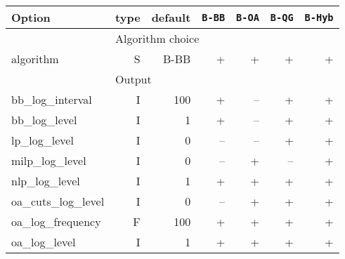\begin{center}
\begin{tabular}{|l|r|r|r|r|r|r|}\hline
Option & type &  default & {\tt B-BB} & {\tt B-OA} & {\tt B-QG} & {\tt B-Hyb} \\
\hline
\hline
\multicolumn{1}{|c}{} & \multicolumn{6}{l|}{Algorithm choice}\\
\hline
algorithm& S& B-BB& +& +& +& +\\
\hline
\multicolumn{1}{|c}{} & \multicolumn{6}{l|}{Output}\\
\hline
bb\_log\_interval& I& 100& +&--& +& +\\
bb\_log\_level& I& 1& +&--& +& +\\
lp\_log\_level& I& 0&--&--& +& +\\
milp\_log\_level& I& 0&--& +&--& +\\
nlp\_log\_level& I& 1& +& +& +& +\\
oa\_cuts\_log\_level& I& 0&--& +& +& +\\
oa\_log\_frequency& F& 100& +& +& +& +\\
oa\_log\_level& I& 1& +& +& +& +\\
\hline
\end{tabular}


\end{center}
